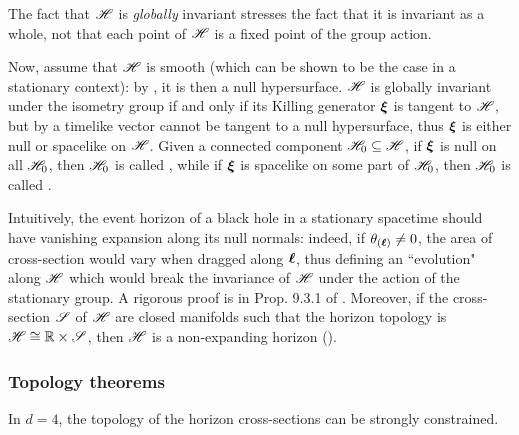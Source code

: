 The fact that $ \mathscr{H} $ is \emph{globally} invariant stresses the fact that it is invariant as a whole, not that each point of $ \mathscr{H} $ is a fixed point of the group action.

Now, assume that $ \mathscr{H} $ is smooth (which can be shown to be the case in a stationary context): by , it is then a null hypersurface. $ \mathscr{H} $ is globally invariant under the isometry group if and only if its Killing generator $ \boldsymbol{\xi} $ is tangent to $ \mathscr{H} $, but by  a timelike vector cannot be tangent to a null hypersurface\footnotemark, thus $ \boldsymbol{\xi} $ is either null or spacelike on $ \mathscr{H} $. Given a connected component $ \mathscr{H}_0 \subseteq \mathscr{H} $, if $ \boldsymbol{\xi} $ is null on all $ \mathscr{H}_0 $, then $ \mathscr{H}_0 $ is called , while if $ \boldsymbol{\xi} $ is spacelike on some part of $ \mathscr{H}_0 $, then $ \mathscr{H}_0 $ is called .


Intuitively, the event horizon of a black hole in a stationary spacetime should have vanishing expansion along its null normals: indeed, if $ \theta_{(\boldsymbol{\ell})} \neq 0 $, the area of cross-section would vary when dragged along $ \boldsymbol{\ell} $, thus defining an ``evolution" along $ \mathscr{H} $ which would break the invariance of $ \mathscr{H} $ under the action of the stationary group. A rigorous proof is in Prop. 9.3.1 of \cite{hawking-hellis}. Moreover, if the cross-section $ \mathscr{S} $ of $ \mathscr{H} $ are closed manifolds such that the horizon topology is $ \mathscr{H} \cong \mathbb{R} \times \mathscr{S} $, then $ \mathscr{H} $ is a non-expanding horizon ().

\subsubsection{Topology theorems}

In $ d = 4 $, the topology of the horizon cross-sections can be strongly constrained.

